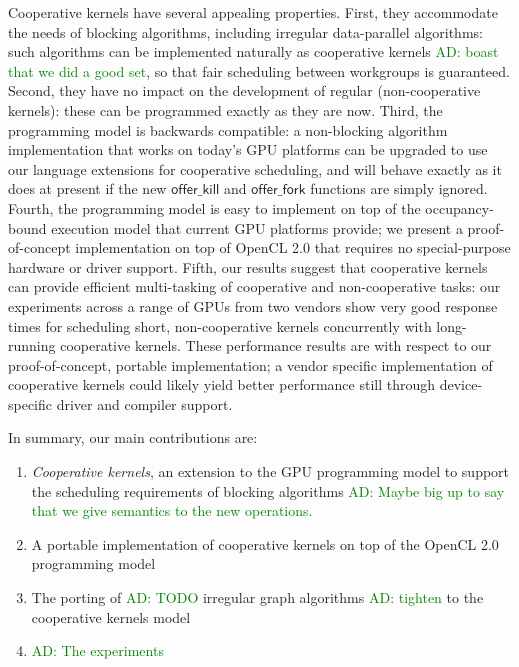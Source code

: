 \documentclass[nocopyrightspace]{sigplanconf-pldi16}
\newcommand{\ADComment}[1]{\textcolor{green}{AD: #1}}
\newcommand{\offerfork}{\mathsf{offer\_fork}}
\newcommand{\offerkill}{\mathsf{offer\_kill}}
\begin{document}
Cooperative kernels have several appealing properties.  First, they
accommodate the needs of blocking algorithms, including irregular
data-parallel algorithms: such algorithms can be implemented naturally
as cooperative kernels \ADComment{boast that we did a good set}, so
that fair scheduling between workgroups is guaranteed.  Second, they
have no impact on the development of regular (non-cooperative
kernels): these can be programmed exactly as they are now.  Third, the
programming model is backwards compatible: a non-blocking algorithm
implementation that works on today's GPU platforms can be upgraded to
use our language extensions for cooperative scheduling, and will
behave exactly as it does at present if the new $\offerkill$ and
$\offerfork$ functions are simply ignored.  Fourth, the programming
model is easy to implement on top of the occupancy-bound execution
model that current GPU platforms provide; we present a
proof-of-concept implementation on top of OpenCL 2.0 that requires no
special-purpose hardware or driver support.  Fifth, our results
suggest that cooperative kernels can provide efficient multi-tasking
of cooperative and non-cooperative tasks: our experiments across a
range of GPUs from two vendors show very good response times for
scheduling short, non-cooperative kernels concurrently with
long-running cooperative kernels.  These performance results are with
respect to our proof-of-concept, portable implementation; a vendor
specific implementation of cooperative kernels could likely yield
better performance still through device-specific driver and compiler
support.

In summary, our main contributions are:

\begin{enumerate}

\item \emph{Cooperative kernels}, an extension to the GPU programming model to support the scheduling requirements of blocking algorithms  \ADComment{Maybe big up to say that we give semantics to the new operations.}

\item A portable implementation of cooperative kernels on top of the OpenCL 2.0 programming model

\item The porting of \ADComment{TODO} irregular graph algorithms \ADComment{tighten} to the cooperative kernels model

\item \ADComment{The experiments}

\end{enumerate}
\end{document}
